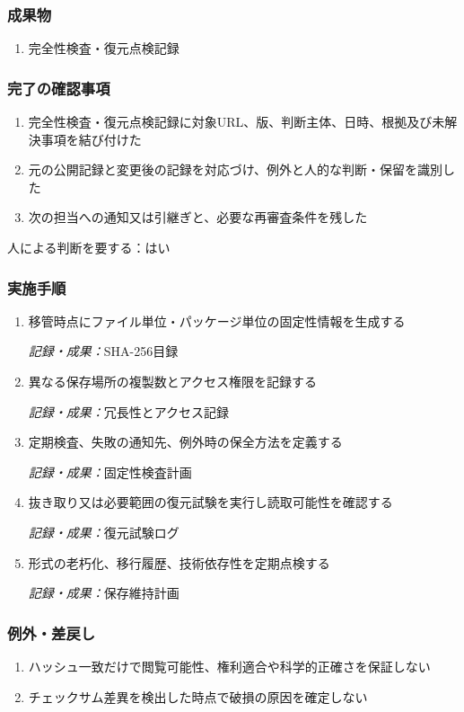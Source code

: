 \documentclass[a4paper,11pt]{article}
\begin{document}
\subsubsection*{成果物}
\begin{enumerate}[leftmargin=2em,itemsep=0.35em]
\item 完全性検査・復元点検記録
\end{enumerate}
\subsubsection*{完了の確認事項}
\begin{enumerate}[leftmargin=2em,itemsep=0.35em]
\item 完全性検査・復元点検記録に対象URL、版、判断主体、日時、根拠及び未解決事項を結び付けた
\item 元の公開記録と変更後の記録を対応づけ、例外と人的な判断・保留を識別した
\item 次の担当への通知又は引継ぎと、必要な再審査条件を残した
\end{enumerate}
\par 人による判断を要する：はい\par\medskip
\subsubsection*{実施手順}
\begin{enumerate}[leftmargin=2em,itemsep=0.65em]
\item 移管時点にファイル単位・パッケージ単位の固定性情報を生成する\par\noindent\textit{記録・成果：}SHA-256目録\nobreak\smallskip
\item 異なる保存場所の複製数とアクセス権限を記録する\par\noindent\textit{記録・成果：}冗長性とアクセス記録\nobreak\smallskip
\item 定期検査、失敗の通知先、例外時の保全方法を定義する\par\noindent\textit{記録・成果：}固定性検査計画\nobreak\smallskip
\item 抜き取り又は必要範囲の復元試験を実行し読取可能性を確認する\par\noindent\textit{記録・成果：}復元試験ログ\nobreak\smallskip
\item 形式の老朽化、移行履歴、技術依存性を定期点検する\par\noindent\textit{記録・成果：}保存維持計画\nobreak\smallskip
\end{enumerate}
\subsubsection*{例外・差戻し}
\begin{enumerate}[leftmargin=2em,itemsep=0.35em]
\item ハッシュ一致だけで閲覧可能性、権利適合や科学的正確さを保証しない
\item チェックサム差異を検出した時点で破損の原因を確定しない
\end{enumerate}
\end{document}
